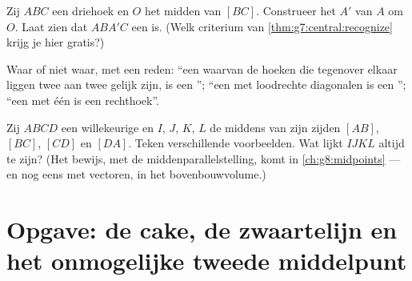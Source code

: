 \begin{exercise}[$\star\star$]\label{exo:g7:central:9}
Zij $ABC$ een driehoek en $O$ het midden van $[BC]$. Construeer het 
$A'$ van $A$ om $O$. Laat zien dat $ABA'C$ een  is. (Welk criterium van
\cref{thm:g7:central:recognize} krijg je hier gratis?)
\end{exercise}

\begin{exercise}[$\star\star$]\label{exo:g7:central:10}
Waar of niet waar, met een reden: ``een  waarvan de hoeken die tegenover
elkaar liggen twee aan twee gelijk zijn, is een ''; ``een 
met loodrechte diagonalen is een ''; ``een  met één  is
een rechthoek''.
\end{exercise}

\begin{exercise}[$\star\star\star$]\label{exo:g7:central:11}
Zij $ABCD$ een willekeurige  en $I$, $J$, $K$, $L$ de middens van zijn
zijden $[AB]$, $[BC]$, $[CD]$ en $[DA]$. Teken verschillende voorbeelden. Wat lijkt
$IJKL$ altijd te zijn? (Het bewijs, met de middenparallelstelling, komt in
\cref{ch:g8:midpoints} --- en nog eens met vectoren, in het bovenbouwvolume.)
\end{exercise}

\section{Opgave: de cake, de zwaartelijn en het onmogelijke tweede middelpunt}

